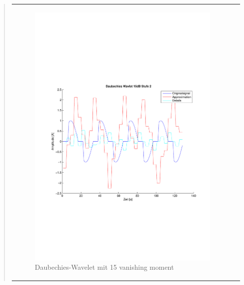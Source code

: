 \begin{quote}
\begin{center}
\begin{tabular}{ll}
\begin{minipage}{0.6\textwidth}
                    \end{minipage}
                    \begin{minipage}{0.6\textwidth}
    
                        \begin{figure}[H]
                            \label{fig:}
                            \includegraphics[scale=0.45, trim = 0.8cm 6cm 3cm
                            7.5cm,
                            clip]{./Bilder/Termin8/Daubechies_Wavlet_15db_lvl_2}
                            \caption{Daubechies-Wavelet mit 15 vanishing moment}
                        \end{figure}
                    \vspace{-1.5em}
    
                    \end{minipage}
    

\end{tabular}
\end{center}
\end{quote}

